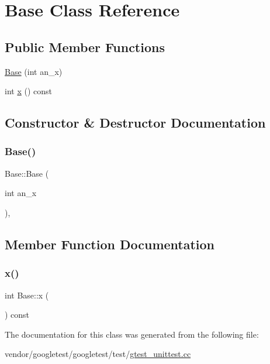 \hypertarget{class_base}{}\section{Base Class Reference}
\label{class_base}
\subsection*{Public Member Functions}
\begin{DoxyCompactItemize}
\item 
\hyperlink{class_base_a1d5f3fb92f8cbc687705785bdc6abd18}{Base} (int an\+\_\+x)
\item 
int \hyperlink{class_base_a779fd2b157ebd763b15383d96047e07c}{x} () const
\end{DoxyCompactItemize}


\subsection{Constructor \& Destructor Documentation}
\mbox{\label{class_base_a1d5f3fb92f8cbc687705785bdc6abd18}} 
\subsubsection{\texorpdfstring{Base()}{Base()}}
{\footnotesize\ttfamily Base\+::\+Base (\begin{DoxyParamCaption}\item[{int}]{an\+\_\+x }\end{DoxyParamCaption})\hspace{0.3cm}{\ttfamily [inline]}, {\ttfamily [explicit]}}



\subsection{Member Function Documentation}
\mbox{\label{class_base_a779fd2b157ebd763b15383d96047e07c}} 
\subsubsection{\texorpdfstring{x()}{x()}}
{\footnotesize\ttfamily int Base\+::x (\begin{DoxyParamCaption}{ }\end{DoxyParamCaption}) const\hspace{0.3cm}{\ttfamily [inline]}}



The documentation for this class was generated from the following file\+:\begin{DoxyCompactItemize}
\item 
vendor/googletest/googletest/test/\hyperlink{gtest__unittest_8cc}{gtest\+\_\+unittest.\+cc}\end{DoxyCompactItemize}
